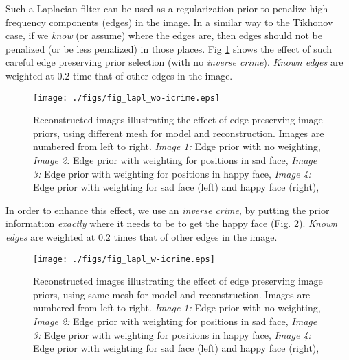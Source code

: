 \documentclass[12pt]{iopart}
\begin{document}
Such a Laplacian filter can be used as a regularization prior
to penalize high frequency components (edges) in the image.
In a similar way to the Tikhonov case, 
if we {\em know} (or assume) where the edges are,
then edges should not be penalized (or be less penalized) in
those places. Fig \ref{fig:laplprior}
shows the effect of such careful
edge preserving prior selection (with no {\em inverse crime}).
{\em Known edges} are weighted at $0.2$ time that of other
edges in the image.

%
%
\begin{figure}[th]
\begin{flushright}
\texttt{[image: ./figs/fig\_lapl\_wo-icrime.eps]}
\caption{\small 
Reconstructed images illustrating the effect of edge
preserving image priors,
using different mesh for model and reconstruction.
Images are numbered from left to right.
{\em Image 1:} Edge prior with no weighting,
{\em Image 2:} Edge prior with weighting for positions in sad face,
{\em Image 3:} Edge prior with weighting for positions in happy face,
{\em Image 4:} Edge prior with weighting for sad face (left) and
happy face (right),
 }
 \label{fig:laplprior}
\end{flushright}
\end{figure}

In order to enhance this effect, we use an {\em inverse crime},
by putting the prior information {\em exactly} where
it needs to be to get the happy face
(Fig. \ref{fig:laplprior-icrime}).
{\em Known edges} are weighted at $0.2$ times that of other
edges in the image.

%
%
\begin{figure}[th]
\begin{flushright}
\texttt{[image: ./figs/fig\_lapl\_w-icrime.eps]}
\caption{\small 
Reconstructed images illustrating the effect of edge
preserving image priors,
using same mesh for model and reconstruction.
Images are numbered from left to right.
{\em Image 1:} Edge prior with no weighting,
{\em Image 2:} Edge prior with weighting for positions in sad face,
{\em Image 3:} Edge prior with weighting for positions in happy face,
{\em Image 4:} Edge prior with weighting for sad face (left) and
happy face (right),
 }
 \label{fig:laplprior-icrime}
\end{flushright}
\end{figure}
\end{document}
